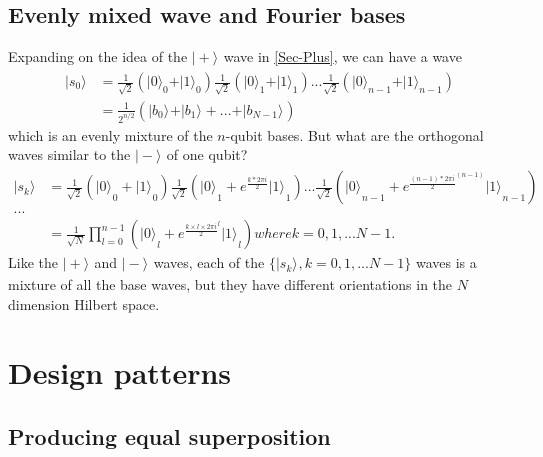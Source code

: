 \documentclass{book}
\newcommand{\keta}[2][]{\vert {#2} \rangle_{#1}}
\begin{document}
\subsection{Evenly mixed wave and Fourier bases}
Expanding on the idea of the $\keta{+}$ wave in \ref{Sec-Plus}, we can have a wave
\begin{equation}
\begin{array}{rl}
    \keta{s_0} &= \frac 1 {\sqrt{2}} (\keta[0]{0}+\keta[0]{1}) \frac 1 {\sqrt{2}} (\keta[1]{0}+\keta[1]{1})
    ... \frac 1 {\sqrt{2}} (\keta[n-1]{0}+\keta[n-1]{1}) \\
    &= \frac 1 {2^{n/2}} (\keta{b_0}+\keta{b_1}+...+\keta{b_{N-1}})
 \end{array}
\end{equation}
which is an evenly mixture of the $n$-qubit bases. But what are the orthogonal waves similar to the $\keta{-}$ of one qubit?
\begin{equation}
\begin{array}{rl}
\keta{s_k} &= \frac 1 {\sqrt{2}} ({\keta{0}}_0+{\keta{1}}_0)
    \frac 1 {\sqrt{2}} ({\keta{0}}_1+e^{\frac {k*2 \pi i} 2}{\keta{1}}_1)
    ...  \frac 1 {\sqrt{2}} ({\keta{0}}_{n-1}+e^{\frac {(n-1)*2\pi i} 2^(n-1)}{\keta{1}}_{n-1}) \\
    ... \\
    &= \frac 1 {\sqrt{N}} \prod^{n-1}_{l=0} ({\keta{0}}_l+e^{\frac {k\times l \times 2\pi i} 2^l}{\keta{1}}_l) where k=0, 1, ...N-1.
\end{array}
\end{equation}
Like the $\keta{+}$ and $\keta{-}$ waves, each of the $\{\keta{s_k}, k=0, 1, ... N-1\}$ waves is a mixture of all the base waves, but they have different orientations in the $N$ dimension Hilbert space.

\section{Design patterns}

\subsection{Producing equal superposition}
\end{document}
